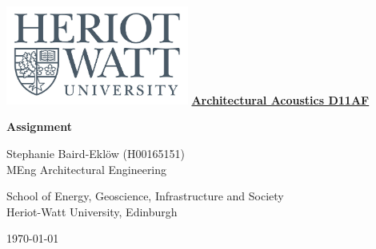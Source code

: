\documentclass{article}
\numberwithin{equation}{section}
\numberwithin{figure}{section}
\numberwithin{table}{section}
\begin{document}
\begin{titlepage}
    \includegraphics[width=6cm, left]{figures/HWlogo2016.jpg} %
    \centering
    \vfill
    {\bfseries\LARGE
        \textbf{\underline{Architectural Acoustics D11AF}}
    }
    
    {\bfseries\LARGE
        \textbf{Assignment}
    }
  
    
    \vfill
    {\Large
        Stephanie Baird-Ekl\"{o}w (H00165151)\\MEng Architectural Engineering
        
        School of Energy, Geoscience, Infrastructure and Society\\Heriot-Watt University, Edinburgh
        
        \today
    }
\end{titlepage}



  \newpage
  \large\tableofcontents
  
  


      \newpage
      \listoffigures
      \newpage
      \listoftables
      \newpage

  
  \newpage

  
  \newpage
  
  
  \newpage
  
  
  \newpage
  
  
  \newpage
  
  
  \newpage
  
  
  \newpage
  
  
  \newpage

  
  \newpage

  
\end{document}
